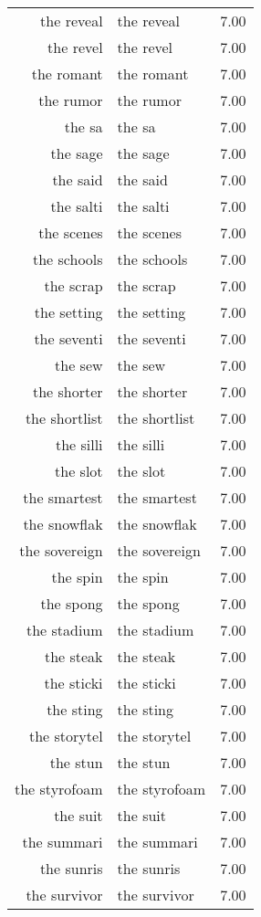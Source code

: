 \begin{table}[ht]
\begin{tabular}{rlr}
  the reveal & the reveal & 7.00 \\ 
  the revel & the revel & 7.00 \\ 
  the romant & the romant & 7.00 \\ 
  the rumor & the rumor & 7.00 \\ 
  the sa & the sa & 7.00 \\ 
  the sage & the sage & 7.00 \\ 
  the said & the said & 7.00 \\ 
  the salti & the salti & 7.00 \\ 
  the scenes & the scenes & 7.00 \\ 
  the schools & the schools & 7.00 \\ 
  the scrap & the scrap & 7.00 \\ 
  the setting & the setting & 7.00 \\ 
  the seventi & the seventi & 7.00 \\ 
  the sew & the sew & 7.00 \\ 
  the shorter & the shorter & 7.00 \\ 
  the shortlist & the shortlist & 7.00 \\ 
  the silli & the silli & 7.00 \\ 
  the slot & the slot & 7.00 \\ 
  the smartest & the smartest & 7.00 \\ 
  the snowflak & the snowflak & 7.00 \\ 
  the sovereign & the sovereign & 7.00 \\ 
  the spin & the spin & 7.00 \\ 
  the spong & the spong & 7.00 \\ 
  the stadium & the stadium & 7.00 \\ 
  the steak & the steak & 7.00 \\ 
  the sticki & the sticki & 7.00 \\ 
  the sting & the sting & 7.00 \\ 
  the storytel & the storytel & 7.00 \\ 
  the stun & the stun & 7.00 \\ 
  the styrofoam & the styrofoam & 7.00 \\ 
  the suit & the suit & 7.00 \\ 
  the summari & the summari & 7.00 \\ 
  the sunris & the sunris & 7.00 \\ 
  the survivor & the survivor & 7.00 \\ 

\end{tabular}
\end{table}
